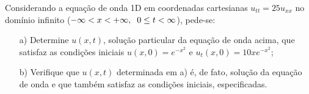 \linespread{1.5}
Considerando a equação de onda 1D em coordenadas cartesianas $u_{tt} = 25 u_{xx}$ no domínio infinito ($-\infty < x < + \infty, \hspace{0.2cm} 0 \leq t < \infty$), pede-se:
\begin{itemize}
    \item[a)] Determine $u(x,t)$, solução particular da equação de onda acima, que satisfaz as condições iniciais $u(x,0) = e^{-x^2}$ e $u_t(x,0) = 10xe^{-x^2}$;
    \item[b)] Verifique que $u(x,t)$ determinada em a) é, de fato, solução da equação de onda e que também satisfaz as condições iniciais, especificadas.
\end{itemize}